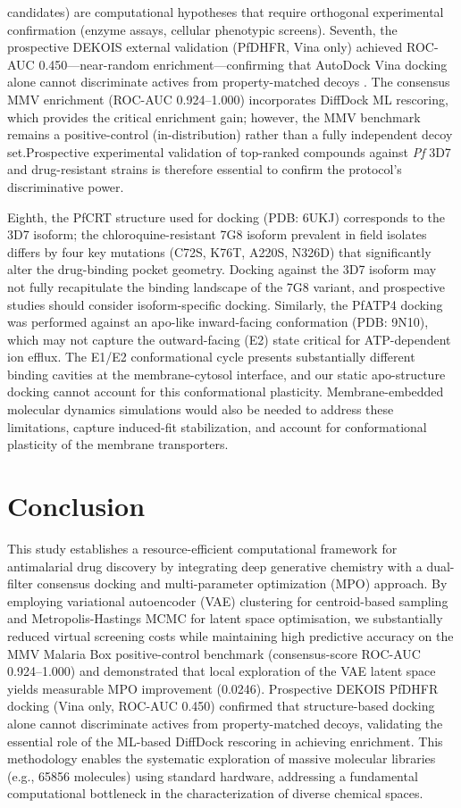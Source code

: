 \documentclass[journal=jcisd8,manuscript=article]{achemso}
\begin{document}
candidates) are computational hypotheses that require orthogonal experimental confirmation (enzyme assays, cellular phenotypic screens). Seventh, the prospective DEKOIS external validation (PfDHFR, Vina only) achieved ROC-AUC \num{0.450}---near-random enrichment---confirming that AutoDock Vina docking alone cannot discriminate actives from property-matched decoys \cite{Bauer2013}. The consensus MMV enrichment (ROC-AUC \numrange{0.924}{1.000}) incorporates DiffDock ML rescoring, which provides the critical enrichment gain; however, the MMV benchmark remains a positive-control (in-distribution) rather than a fully independent decoy set.Prospective experimental validation of top-ranked compounds against \textit{Pf} 3D7 and drug-resistant strains is therefore essential to confirm the protocol's discriminative power.

Eighth, the PfCRT structure used for docking (PDB: 6UKJ) corresponds to the 3D7 isoform; the chloroquine-resistant 7G8 isoform prevalent in field isolates differs by four key mutations (C72S, K76T, A220S, N326D) that significantly alter the drug-binding pocket geometry. Docking against the 3D7 isoform may not fully recapitulate the binding landscape of the 7G8 variant, and prospective studies should consider isoform-specific docking. Similarly, the PfATP4 docking was performed against an apo-like inward-facing conformation (PDB: 9N10), which may not capture the outward-facing (E2) state critical for ATP-dependent ion efflux. The E1/E2 conformational cycle presents substantially different binding cavities at the membrane-cytosol interface, and our static apo-structure docking cannot account for this conformational plasticity. Membrane-embedded molecular dynamics simulations would also be needed to address these limitations, capture induced-fit stabilization, and account for conformational plasticity of the membrane transporters.

\section{Conclusion}

This study establishes a resource-efficient computational framework for antimalarial drug discovery by integrating deep generative chemistry with a dual-filter consensus docking and multi-parameter optimization (MPO) approach. By employing variational autoencoder (VAE) clustering for centroid-based sampling and Metropolis-Hastings MCMC for latent space optimisation, we substantially reduced virtual screening costs while maintaining high predictive accuracy on the MMV Malaria Box positive-control benchmark (consensus-score ROC-AUC \numrange{0.924}{1.000}) and demonstrated that local exploration of the VAE latent space yields measurable MPO improvement (\num{+0.0246}). Prospective DEKOIS PfDHFR docking (Vina only, ROC-AUC \num{0.450}) confirmed that structure-based docking alone cannot discriminate actives from property-matched decoys, validating the essential role of the ML-based DiffDock rescoring in achieving enrichment. This methodology enables the systematic exploration of massive molecular libraries (e.g., \num{65856} molecules) using standard hardware, addressing a fundamental computational bottleneck in the characterization of diverse chemical spaces.
\end{document}
